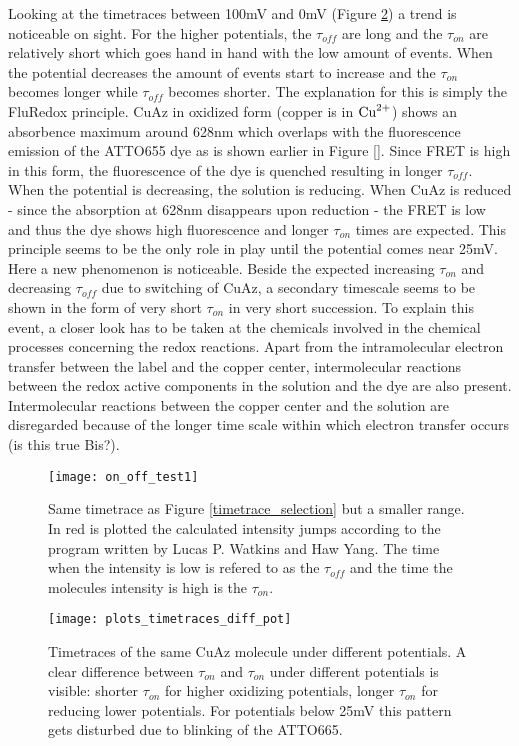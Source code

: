 \documentclass[twoside,single]{lion-msc}
\begin{document}
Looking at the timetraces between 100mV and 0mV (Figure \ref{plots_timetraces_diff_pot}) a trend is noticeable on sight. For the higher potentials, the $\tau_{off}$ are long and the $\tau_{on}$ are relatively short which goes hand in hand with the low amount of events. When the potential decreases the amount of events start to increase and the $\tau_{on}$ becomes longer while $\tau_{off}$ becomes shorter. The explanation for this is simply the FluRedox principle. CuAz in oxidized form (copper is in $\textup{Cu}^{2+}$) shows an absorbence maximum around 628nm which overlaps with the fluorescence emission of the ATTO655 dye as is shown earlier in Figure \ref{}. Since FRET is high in this form, the fluorescence of the dye is quenched resulting in longer $\tau_{off}$. When the potential is decreasing, the solution is reducing. When CuAz is reduced - since the absorption at 628nm disappears upon reduction - the FRET is low and thus the dye  shows high fluorescence and longer $\tau_{on}$ times are expected. This principle seems to be the only role in play until the potential comes near 25mV. Here a new phenomenon is noticeable. Beside the expected  increasing $\tau_{on}$ and decreasing $\tau_{off}$ due to switching of CuAz, a secondary timescale seems to be shown in the form of very short $\tau_{on}$ in very short succession. To explain this event, a closer look has to be taken at the chemicals involved in the chemical processes concerning the redox reactions. Apart from the intramolecular electron transfer between the label and the copper center, intermolecular reactions between the redox active components in the solution and the dye are also present. Intermolecular reactions between the copper center and the solution are disregarded because of the longer time scale within which electron transfer occurs (is this true Bis?). 

\begin{figure}[ht!]
\centering
\texttt{[image: on\_off\_test1]}
\caption{Same timetrace as Figure \ref{timetrace_selection} but a smaller range. In red is plotted the calculated intensity jumps according to the program written by Lucas P. Watkins and Haw Yang. The time when the intensity is low is refered to as the $\tau_{off}$ and the time the molecules intensity is high is the $\tau_{on}$.}
\label{on_off_times}
\end{figure}

\begin{figure}[ht!]
\centering
\texttt{[image: plots\_timetraces\_diff\_pot]}
\caption{Timetraces of the same CuAz molecule under different potentials. A clear difference between $\tau_{on}$ and $\tau_{on}$ under different potentials is visible: shorter $\tau_{on}$ for higher oxidizing potentials, longer $\tau_{on}$ for reducing lower potentials. For potentials below 25mV this pattern gets disturbed due to blinking of the ATTO665.}
\label{plots_timetraces_diff_pot}
\end{figure}
\end{document}
